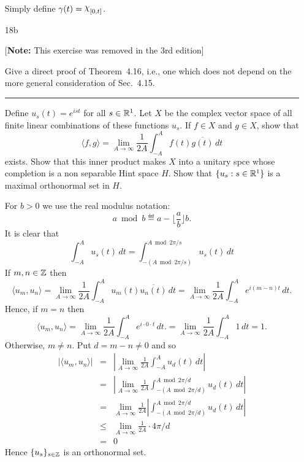 \begin{enumerate}
Simply define \(\gamma(t) = {\chhi}_{[0,t]}\).


\item[18b]
\begin{minipage}[t]{.8\textwidth}\footnotesize
[\textbf{Note:} This exercise was removed in the 3rd edition]

Give a direct proof of Theorem~4.16, i.e., one which does not
depend on the more general consideration of Sec.~4.15.
\smallskip\hrule
\end{minipage}


\begin{excopy}
Define \(u_s(t) = e^{ist}\) for all \(s\in \mathbb{R}^1\).
Let $X$ be the complex vector space of all finite linear combinations
of these functions \(u_s\).
If \(f\in X\) and \(g\in X\), show that
\begin{equation*}
\langle f,g\rangle
= \lim_{A\to\infty} \frac{1}{2A} \int_{-A}^A f(t)\overline{g(t)}\,dt
\end{equation*}
exists. Show that this inner product makes $X$ into a unitary spce
whose completion is a non separable Hint space $H$.
Show that \(\{u_s: s\in\mathbb{R}^1\}\) is a maximal orthonormal set in $H$.
\end{excopy}

For \(b>0\) we use the real modulus notation:
\begin{equation*}
 a \bmod b \eqdef a - \lfloor \frac{a}{b} \rfloor b.
\end{equation*}
It is clear that
\begin{equation*}
\int_{-A}^A u_s(t)\,dt = \int_{-(A \bmod 2\pi/s) }^{A \bmod 2\pi/s} u_s(t)\,dt
\end{equation*}
If \(m, n \in \mathbb{Z}\) then
\begin{equation*}
\langle u_m,u_n\rangle
= \lim_{A\to\infty} \frac{1}{2A} \int_{-A}^A u_m(t)\overline{u_n(t)}\,dt
= \lim_{A\to\infty} \frac{1}{2A} \int_{-A}^A e^{i(m-n)t}\,dt.
\end{equation*}
Hence, if \(m=n\) then
\begin{equation*}
\langle u_m,u_n\rangle
= \lim_{A\to\infty} \frac{1}{2A} \int_{-A}^A e^{i\cdot 0\cdot t}\,dt.
= \lim_{A\to\infty} \frac{1}{2A} \int_{-A}^A 1\,dt
= 1.
\end{equation*}
Otherwise, \(m\neq n\). Put \(d = m - n \neq 0\) and so
\begin{eqnarray*}
|\langle u_m,u_n\rangle|
&=& \left|\lim_{A\to\infty} \frac{1}{2A} \int_{-A}^A u_d(t)\,dt\right| \\
&=&\left|\lim_{A\to\infty}
   \frac{1}{2A} \int_{-(A \bmod 2\pi/d)}^{A \bmod 2\pi/d} u_d(t)\,dt\right| \\
&=& \lim_{A\to\infty} \frac{1}{2A} %
   \left|\int_{-(A \bmod 2\pi/d)}^{A \bmod 2\pi/d} u_d(t)\,dt\right| \\
&\leq&  \lim_{A\to\infty} \frac{1}{2A} \cdot 4\pi/d \\
&=& 0
\end{eqnarray*}
Hence \(\{u_s\}_{s\in\mathbb{Z}}\) is an orthonormal set.





\end{enumerate}

